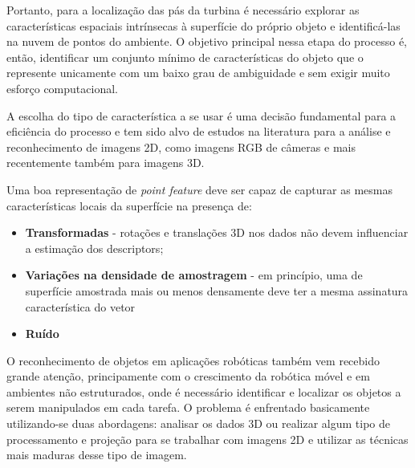 Portanto, para a localização das pás da turbina é
necessário explorar as características espaciais intrínsecas à superfície do
próprio objeto e identificá-las na nuvem de pontos do ambiente. O objetivo
principal nessa etapa do processo é, então, identificar um conjunto mínimo de
características do objeto que o represente unicamente com um baixo grau
de ambiguidade e sem exigir muito esforço computacional. 

A escolha do tipo de característica a se usar é uma decisão fundamental para a
eficiência do processo e tem sido alvo de estudos na literatura para a análise
e reconhecimento de imagens 2D, como imagens RGB de câmeras e mais recentemente
também para imagens 3D. 

Uma boa representação de \textit{point feature} deve ser capaz de capturar as
mesmas características locais da superfície na presença de:

\begin{itemize}
  \item \textbf{Transformadas} -  rotações e translações 3D nos dados não devem
  influenciar a estimação dos descriptors;
  \item \textbf{Variações na densidade de amostragem} - em princípio, uma de
  superfície amostrada mais ou menos densamente deve ter a mesma assinatura característica do vetor
  \item \textbf{Ruído}
\end{itemize}

O reconhecimento de objetos em aplicações robóticas também vem recebido
grande atenção, principamente com o crescimento da robótica móvel e em ambientes
não estruturados, onde é necessário identificar e localizar os objetos a serem
manipulados em cada tarefa. O problema é enfrentado basicamente utilizando-se
duas abordagens: analisar os dados 3D ou realizar algum tipo de processamento e
projeção para se trabalhar com imagens 2D e utilizar as técnicas mais maduras
desse tipo de imagem.

